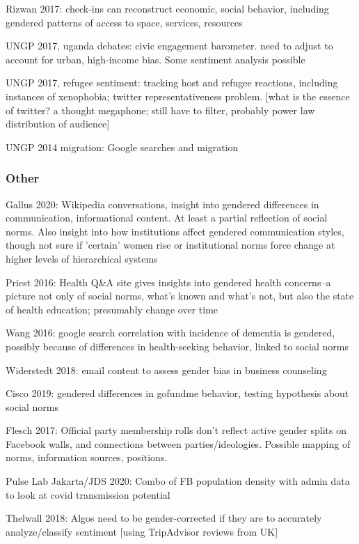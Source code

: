 \documentclass{article}
\begin{document}
Rizwan 2017: check-ins can reconstruct economic, social behavior, including gendered patterns of access to space, services, resources

UNGP 2017, uganda debates: civic engagement barometer. need to adjust to account for urban, high-income bias. Some sentiment analysis possible

UNGP 2017, refugee sentiment: tracking host and refugee reactions, including instances of xenophobia; twitter representativeness problem. [what is the essence of twitter? a thought megaphone; still have to filter, probably power law distribution of audience]

UNGP 2014 migration: Google searches and migration 

\subsubsection{Other}

Gallus 2020: Wikipedia conversations, insight into gendered differences in communication, informational content. At least a partial reflection of social norms. Also insight into how institutions affect gendered communication styles, though not sure if 'certain' women rise or institutional norms force change at higher levels of hierarchical systems

Priest 2016: Health Q&A site gives insights into gendered health concerns--a picture not only of social norms, what's known and what's not, but also the state of health education; presumably change over time

Wang 2016: google search correlation with incidence of dementia is gendered, possibly because of differences in health-seeking behavior, linked to social norms

Widerstedt 2018: email content to assess gender bias in business counseling

Cisco 2019: gendered differences in gofundme behavior, testing hypothesis about social norms

Flesch 2017: Official party membership rolls don't reflect active gender splits on Facebook walls, and connections between parties/ideologies. Possible mapping of norms, information sources, positions.

Pulse Lab Jakarta/JDS 2020: Combo of FB population density with admin data to look at covid transmission potential 

Thelwall 2018: Algos need to be gender-corrected if they are to accurately analyze/classify sentiment [using TripAdvisor reviews from UK]
\end{document}
